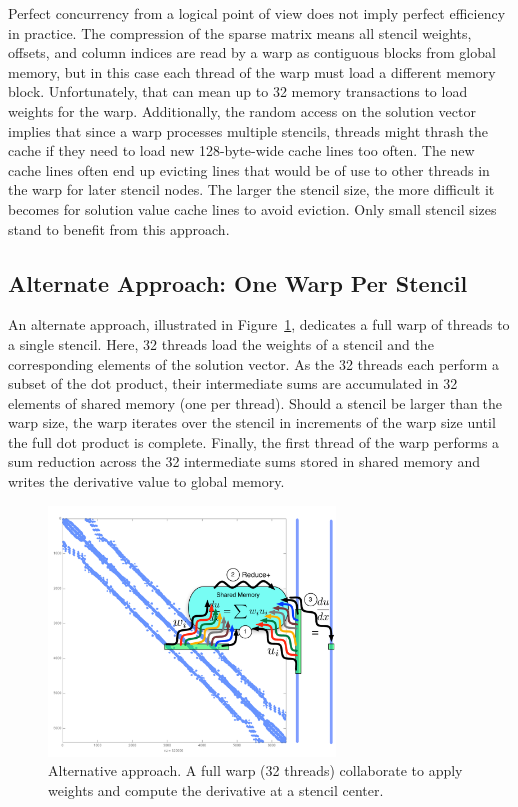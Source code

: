 \documentclass{report}
\begin{document}
Perfect concurrency from a logical point of view does not 
imply perfect efficiency in practice. The compression of the sparse matrix means all stencil weights, offsets, and column indices are read by a warp as contiguous blocks from global memory, but in this case each thread of the warp must load a different memory block. Unfortunately, that can mean up to 32 memory transactions to load weights for the warp. Additionally, the random access on the solution vector implies that since a warp processes multiple stencils, threads might thrash the cache if they need to load new 128-byte-wide cache lines too often. The new cache lines often end up evicting lines that would be of use to other threads in the warp for later stencil nodes. The larger the stencil size, the more difficult it becomes for solution value cache lines to avoid eviction. Only small stencil sizes stand to benefit from this approach. 




\subsection{Alternate Approach: One Warp Per Stencil} 

An alternate approach, illustrated in Figure~\ref{fig:oneWarpPerStencil}, dedicates a full warp of threads to a single stencil. Here, 32 threads load the weights of a stencil and the corresponding elements of the solution vector. As the 32 threads each perform a subset of the dot product, their intermediate sums are accumulated in 32 elements of shared memory (one per thread).
Should  a stencil be larger than the warp size, the warp iterates over the stencil in increments of the warp size until the full dot product is complete. Finally, the first thread of the warp performs a sum reduction across the 32 intermediate sums stored in shared memory and writes the derivative value to global memory. 

\begin{figure}[ht]
      \centering
       \includegraphics[width=3in]{../figures/paper1/figures/omnigraffle/oneWarpPerStencil.pdf}
      \caption{Alternative approach. A full warp (32 threads) collaborate to apply weights  and compute the derivative at a stencil center. }
      \label{fig:oneWarpPerStencil}
\end{figure}
\end{document}
